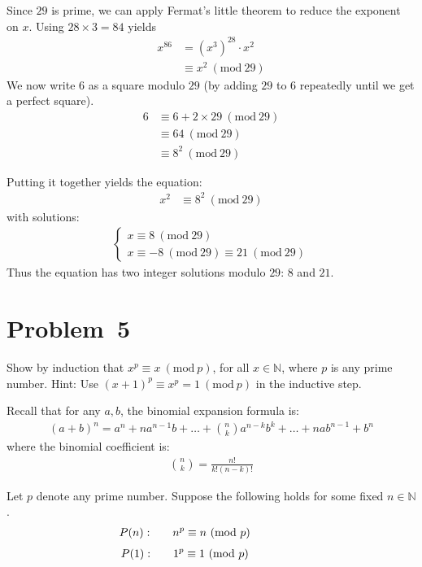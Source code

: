 \documentclass[12pt]{article}
\newcommand{\modulo}[1]{~(\mathrm{mod}~#1)}
\begin{document}
Since $29$ is prime, we can apply Fermat's little theorem to reduce the exponent on $x$. Using $28 \times 3 = 84$ yields
\begin{align*}
x^{86} 
  & = (x^{3})^{28} \cdot x^{2} \\
  & \equiv x^{2} \modulo{29} 
\end{align*}
We now write $6$ as a square modulo $29$ (by adding $29$ to $6$ repeatedly until we get a perfect square). 
\begin{align*}
6 & \equiv 6 + 2 \times 29 \modulo{29} \\
  & \equiv 64 \modulo{29} \\
  & \equiv 8^{2} \modulo{29}   
\end{align*}

Putting it together yields the equation:
\begin{align*}
x^{2} 
  & \equiv 8^{2} \modulo{29} 
\end{align*}
with solutions:
\begin{align*}
\begin{cases}
x \equiv 8 \modulo{29} \\
x \equiv -8 \modulo{29} \equiv 21 \modulo{29} 
\end{cases}
\end{align*}
Thus the equation has two integer solutions modulo $29$: $8$ and $21$.



\clearpage
\section*{Problem~5}
\begin{question}
Show by induction that $x^{p}\equiv x\modulo{p}$, for all $x\in\mathbb{N}$, where $p$ is any prime number. Hint: Use $(x+1)^{p}\equiv x^{p}=1\modulo{p}$ in the inductive step. 
\end{question}

Recall that for any $a,b$, the binomial expansion formula is:
\begin{align*}
(a + b)^{n} 
 = a^{n} + n a^{n-1}b + \ldots + \binom{n}{k} a^{n-k}b^{k}  + \ldots + n ab^{n-1} + b^{n} 
\end{align*}
where the binomial coefficient is:
\begin{align*}
\binom{n}{k} = \frac{n!}{k!(n-k)!}
\end{align*}

Let $p$ denote any prime number. Suppose the following holds for some fixed $n\in\mathbb{N}$.
\begin{align*}
\mathllap{P(n): \hspace{2em}}
  n^{p}\equiv n\modulo{p}
\end{align*}
\begin{align*}
\mathllap{P(1): \hspace{2em}}
1^{p} \equiv 1 \modulo{p}
\end{align*}
\end{document}
